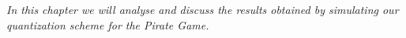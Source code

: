 \label{cap:chapter5}

\textit{In this chapter we will analyse and discuss the results obtained by simulating our quantization scheme for the Pirate Game.}




\cleardoublepage
